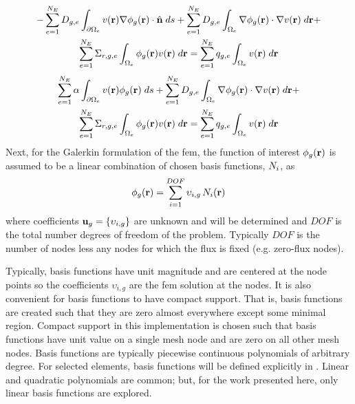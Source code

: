     \begin{multline} 
      -\sum_{e=1}^{N_E} D_{g,e} \int_{\partial \Omega_e} v(\mathbf{r}) \mathbf{\nabla}
      \phi_g(\mathbf{r}) \cdot \hat{\mathbf{n}} \;ds + \sum_{e=1}^{N_E} 
        D_{g,e} \int_{\Omega_e} \mathbf{\nabla} \phi_g(\mathbf{r}) \cdot \mathbf{\nabla} v(\mathbf{r}) 
        \; d\mathbf{r} + \\
        \sum_{e=1}^{N_E} \Sigma_{r,g,e} \int_{\Omega_e} \phi_g(\mathbf{r}) v(\mathbf{r}) 
        \; d\mathbf{r} =
        \sum_{e=1}^{N_E} q_{g,e} \int_{\Omega_e} v(\mathbf{r}) \; d\mathbf{r}
    \end{multline}
    \begin{multline}
      \label{eq:element_boundary}
      \sum_{e=1}^{N_E} \alpha \int_{\partial \Omega_e} v(\mathbf{r}) 
        \phi_g(\mathbf{r}) \;ds + \sum_{e=1}^{N_E} D_{g,e}
        \int_{\Omega_e} \mathbf{\nabla} \phi_g(\mathbf{r}) \cdot \mathbf{\nabla} v(\mathbf{r}) \; d\mathbf{r} + \\
        \sum_{e=1}^{N_E} \Sigma_{r,g,e} \int_{\Omega_e} \phi_g(\mathbf{r}) v(\mathbf{r}) 
        \; d\mathbf{r} =
        \sum_{e=1}^{N_E} q_{g,e} \int_{\Omega_e} v(\mathbf{r}) \; d\mathbf{r}
    \end{multline}
    Next, for the Galerkin formulation of the \gls{fem}, the function of
    interest $\phi_g(\mathbf{r})$ is assumed to be a linear combination of chosen basis
    functions, $N_i$, as
    \begin{equation} 
      \label{eq:linear_combination}
      \phi_g(\mathbf{r}) = \sum_{i=1}^{DOF} \upsilon_{i,g} \, N_i(\mathbf{r})
    \end{equation}
    where coefficients $\mathbf{u}_g = \{\upsilon_{i,g}\}$ are unknown and will be 
    determined and $DOF$ is the total number degrees of freedom of the problem. 
    Typically $DOF$ is the number of nodes less any nodes for which the flux is 
    fixed (e.g. zero-flux nodes). 
    
    Typically, basis functions have unit magnitude and are centered at the node
    points so the coefficients $\upsilon_{i,g}$ are the \gls{fem} solution at the
    nodes. It is also convenient for basis functions to have compact support.
    That is, basis functions are created such that they are zero almost
    everywhere except some minimal region. Compact support in this
    implementation is chosen such that basis functions have unit value on a
    single mesh node and are zero on all other mesh nodes. Basis functions are
    typically piecewise continuous polynomials of arbitrary degree. For selected
    elements, basis functions will be defined explicitly in
    . Linear and quadratic polynomials are common;
    but, for the work presented here, only linear basis functions are explored.

